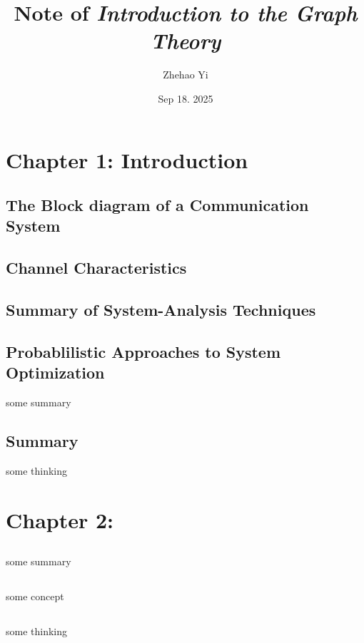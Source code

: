 \documentclass[12pt,a4paper]{book}
\title{Note of \textit{Introduction to the Graph Theory}}
\author{Zhehao Yi}
\date{Sep 18. 2025}
\begin{document}
\maketitle
\tableofcontents
\newpage

\chapter{Chapter 1: Introduction}

\section{The Block diagram of a Communication System}

\section{Channel Characteristics}

\section{Summary of System-Analysis Techniques}

\section{Probablilistic Approaches to System Optimization}
\begin{notebox}[Summary]
some summary
\end{notebox}

\section{Summary}
\begin{notebox}[Thinking]
some thinking
\end{notebox}

\chapter{Chapter 2:}
\section{}
\begin{notebox}[Summary]
some summary
\end{notebox}

\section{}
\begin{notebox}[Concept]
some concept 
\end{notebox}

\section{}
\begin{notebox}[Thinking]
some thinking
\end{notebox}
\end{document}
